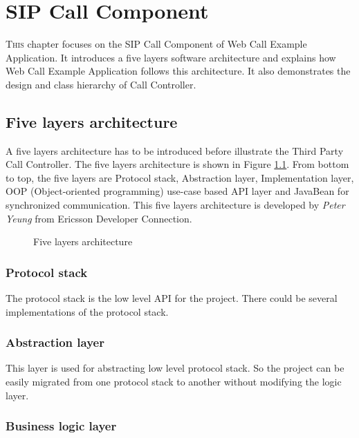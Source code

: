 
\chapter{SIP Call Component}
\label{sec:SIPCallComponent}

\lettrine[lines=3]{T}{his} chapter focuses on the SIP Call Component of \textsf{Web Call Example Application}. It introduces a five layers software architecture and explains how Web Call Example Application follows this architecture. It also demonstrates the design and class hierarchy of Call Controller. 

\section{Five layers architecture}

A five layers architecture has to be introduced before illustrate the Third Party Call Controller. The five layers architecture is shown in Figure \ref{fig:FiveLayersArchitecture}. From bottom to top, the five layers are Protocol stack, Abstraction layer, Implementation layer, OOP (Object-oriented programming) use-case based API layer and JavaBean for synchronized communication. This five layers architecture is developed by \textit{Peter Yeung} from Ericsson Developer Connection.

\begin{figure}[!hbtp]
\centering
{}
\caption{Five layers architecture}
\label{fig:FiveLayersArchitecture}
\end{figure}

\subsection{Protocol stack}

The protocol stack is the low level API for the project. There could be several implementations of the protocol stack. 

\subsection{Abstraction layer}

This layer is used for abstracting low level protocol stack. So the project can be easily migrated from one protocol stack to another without modifying the logic layer.

\subsection{Business logic layer}

